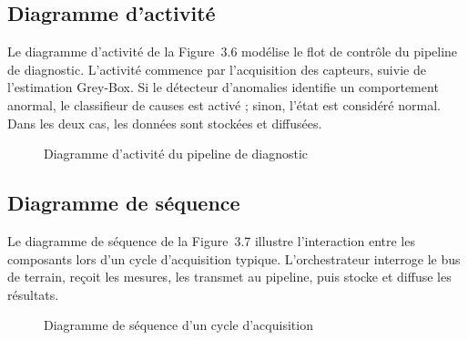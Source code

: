 \subsection{Diagramme d'activité}

Le diagramme d'activité de la Figure~3.6 modélise le flot de contrôle du pipeline de diagnostic. L'activité commence par l'acquisition des capteurs, suivie de l'estimation Grey-Box. Si le détecteur d'anomalies identifie un comportement anormal, le classifieur de causes est activé ; sinon, l'état est considéré normal. Dans les deux cas, les données sont stockées et diffusées.

\begin{figure}[htbp]
  \centering
  \caption{Diagramme d'activité du pipeline de diagnostic}
\end{figure}


\subsection{Diagramme de séquence}

Le diagramme de séquence de la Figure~3.7 illustre l'interaction entre les composants lors d'un cycle d'acquisition typique. L'orchestrateur interroge le bus de terrain, reçoit les mesures, les transmet au pipeline, puis stocke et diffuse les résultats.

\begin{figure}[htbp]
  \centering
  \caption{Diagramme de séquence d'un cycle d'acquisition}
\end{figure}


